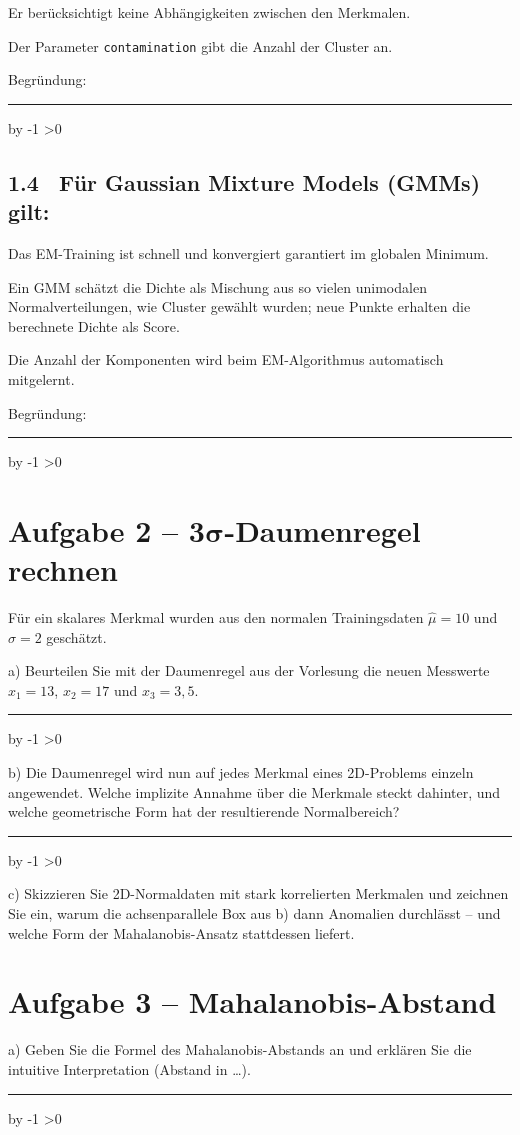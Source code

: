 \documentclass[10pt,a4paper]{article}
\newcommand{\mcbox}{\raisebox{-1pt}{\fbox{\rule{0pt}{7pt}\rule{7pt}{0pt}}}\hspace{6pt}}
\newcommand{\antwortlinien}[1]{%
  \par\vspace{2pt}%
  \newcount\zeilen \zeilen=#1
  \loop
    \noindent\rule{\linewidth}{0.4pt}\par\vspace{11pt}%
    \advance\zeilen by -1
  \ifnum\zeilen>0 \repeat
}
\begin{document}
\mcbox Er berücksichtigt keine Abhängigkeiten zwischen den Merkmalen.

\mcbox Der Parameter \texttt{contamination} gibt die Anzahl der Cluster an.

Begründung:
\antwortlinien{2}

\subsection*{1.4 \ Für Gaussian Mixture Models (GMMs) gilt:}
\mcbox Das EM-Training ist schnell und konvergiert garantiert im globalen Minimum.

\mcbox Ein GMM schätzt die Dichte als Mischung aus so vielen unimodalen Normalverteilungen,
wie Cluster gewählt wurden; neue Punkte erhalten die berechnete Dichte als Score.

\mcbox Die Anzahl der Komponenten wird beim EM-Algorithmus automatisch mitgelernt.

Begründung:
\antwortlinien{2}

\section*{Aufgabe 2 -- 3$\boldsymbol{\sigma}$-Daumenregel rechnen}

Für ein skalares Merkmal wurden aus den normalen Trainingsdaten
$\hat\mu = 10$ und $\hat\sigma = 2$ geschätzt.

a) Beurteilen Sie mit der Daumenregel aus der Vorlesung die neuen Messwerte
$x_1 = 13$, $x_2 = 17$ und $x_3 = 3{,}5$.
\antwortlinien{3}

b) Die Daumenregel wird nun auf jedes Merkmal eines 2D-Problems einzeln angewendet.
Welche implizite Annahme über die Merkmale steckt dahinter, und welche geometrische Form
hat der resultierende Normalbereich?
\antwortlinien{3}

c) Skizzieren Sie 2D-Normaldaten mit stark korrelierten Merkmalen und zeichnen Sie ein,
warum die achsenparallele Box aus b) dann Anomalien \glqq durchlässt\grqq{} --
und welche Form der Mahalanobis-Ansatz stattdessen liefert.

\vspace{5cm}

\section*{Aufgabe 3 -- Mahalanobis-Abstand}

a) Geben Sie die Formel des Mahalanobis-Abstands an und erklären Sie die intuitive
Interpretation (\glqq Abstand in \dots\grqq).
\antwortlinien{3}
\end{document}
